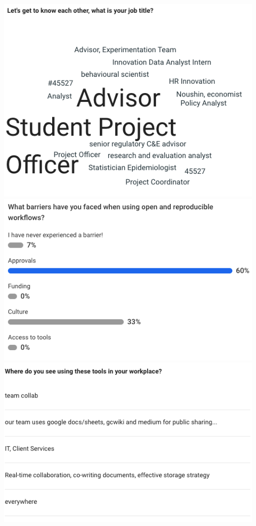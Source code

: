 \documentclass[
  12pt,
]{book}
\begin{document}
\includegraphics{rr-presentation-figure/Q1.png}
\includegraphics{rr-presentation-figure/Q2.png}
\includegraphics{rr-presentation-figure/Q3.png}
\end{document}
